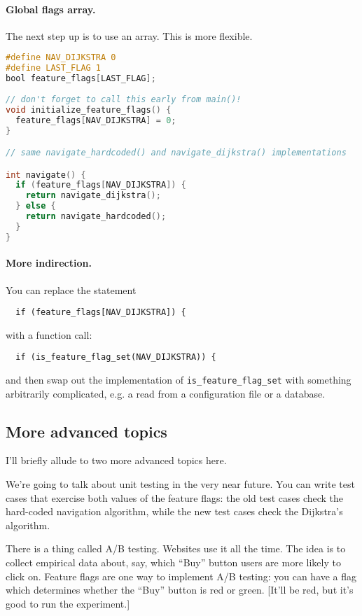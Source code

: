 \documentclass[11pt]{article}
\begin{document}
\paragraph{Global flags array.} The next step up is to use an array.
This is more flexible.
\begin{lstlisting}[language=C]
#define NAV_DIJKSTRA 0
#define LAST_FLAG 1
bool feature_flags[LAST_FLAG];
  
// don't forget to call this early from main()!
void initialize_feature_flags() {
  feature_flags[NAV_DIJKSTRA] = 0;
}

// same navigate_hardcoded() and navigate_dijkstra() implementations

int navigate() {
  if (feature_flags[NAV_DIJKSTRA]) {
    return navigate_dijkstra();
  } else {
    return navigate_hardcoded();
  }
}
\end{lstlisting}

\paragraph{More indirection.} You can replace the statement
\begin{lstlisting}
  if (feature_flags[NAV_DIJKSTRA]) {
\end{lstlisting}
with a function call:
\begin{lstlisting}
  if (is_feature_flag_set(NAV_DIJKSTRA)) {
\end{lstlisting}
and then swap out the implementation of \verb+is_feature_flag_set+ with
something arbitrarily complicated, e.g. a read from a configuration
file or a database.

\subsection*{More advanced topics}
I'll briefly allude to two more advanced topics here.

We're going to talk about unit testing in the very near future. You can
write test cases that exercise both values of the feature flags: the old
test cases check the hard-coded navigation algorithm, while the new
test cases check the Dijkstra's algorithm.

There is a thing called A/B testing. Websites use it all the time.
The idea is to collect empirical data about, say, which ``Buy'' button
users are more likely to click on. Feature flags are one way to
implement A/B testing: you can have a flag which determines whether
the ``Buy'' button is red or green. [It'll be red, but it's good to run the experiment.]
\end{document}
